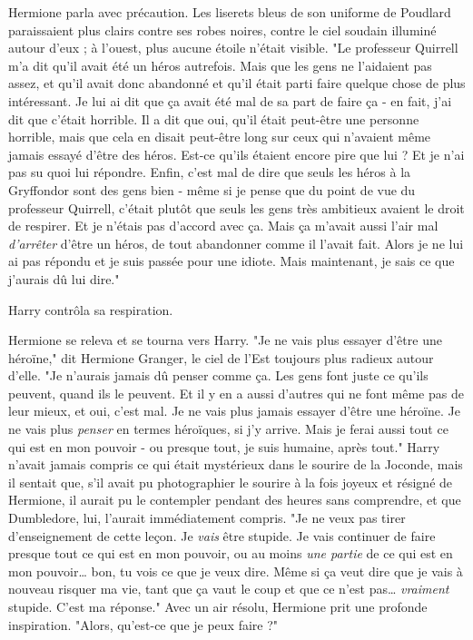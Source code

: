 Hermione parla avec précaution. Les liserets bleus de son uniforme de Poudlard paraissaient plus clairs contre ses robes noires, contre le ciel soudain illuminé autour d'eux ; à l'ouest, plus aucune étoile n'était visible. "Le professeur Quirrell m'a dit qu'il avait été un héros autrefois. Mais que les gens ne l'aidaient pas assez, et qu'il avait donc abandonné et qu'il était parti faire quelque chose de plus intéressant. Je lui ai dit que ça avait été mal de sa part de faire ça - en fait, j'ai dit que c'était horrible. Il a dit que oui, qu'il était peut-être une personne horrible, mais que cela en disait peut-être long sur ceux qui n'avaient même jamais essayé d'être des héros. Est-ce qu'ils étaient encore pire que lui ? Et je n'ai pas su quoi lui répondre. Enfin, c'est mal de dire que seuls les héros à la Gryffondor sont des gens bien - même si je pense que du point de vue du professeur Quirrell, c'était plutôt que seuls les gens très ambitieux avaient le droit de respirer. Et je n'étais pas d'accord avec ça. Mais ça m'avait aussi l'air mal \emph{d'arrêter}  d'être un héros, de tout abandonner comme il l'avait fait. Alors je ne lui ai pas répondu et je suis passée pour une idiote. Mais maintenant, je sais ce que j'aurais dû lui dire."

Harry contrôla sa respiration.

Hermione se releva et se tourna vers Harry. "Je ne vais plus essayer d'être une héroïne," dit Hermione Granger, le ciel de l'Est toujours plus radieux autour d'elle. "Je n'aurais jamais dû penser comme ça. Les gens font juste ce qu'ils peuvent, quand ils le peuvent. Et il y en a aussi d'autres qui ne font même pas de leur mieux, et oui, c'est mal. Je ne vais plus jamais essayer d'être une héroïne. Je ne vais plus \emph{penser}  en termes héroïques, si j'y arrive. Mais je ferai aussi tout ce qui est en mon pouvoir - ou presque tout, je suis humaine, après tout." Harry n'avait jamais compris ce qui était mystérieux dans le sourire de la Joconde, mais il sentait que, s'il avait pu photographier le sourire à la fois joyeux et résigné de Hermione, il aurait pu le contempler pendant des heures sans comprendre, et que Dumbledore, lui, l'aurait immédiatement compris. "Je ne veux pas tirer d'enseignement de cette leçon. Je \emph{vais}  être stupide. Je vais continuer de faire presque tout ce qui est en mon pouvoir, ou au moins \emph{une partie}  de ce qui est en mon pouvoir… bon, tu vois ce que je veux dire. Même si ça veut dire que je vais à nouveau risquer ma vie, tant que ça vaut le coup et que ce n'est pas… \emph{vraiment}  stupide. C'est ma réponse." Avec un air résolu, Hermione prit une profonde inspiration. "Alors, qu'est-ce que je peux faire ?"


